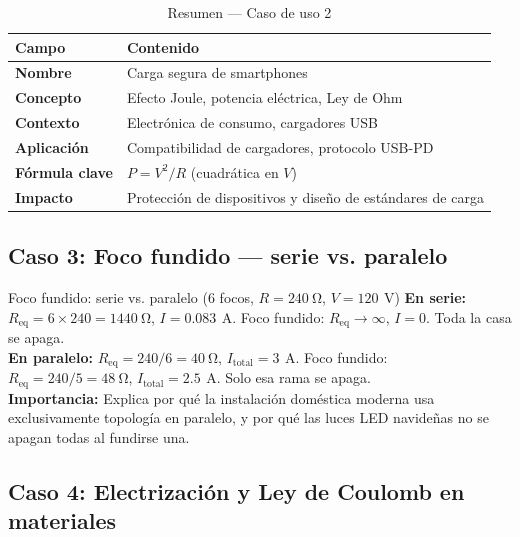 \documentclass[12pt, a4paper]{article}
\newcommand{\V}{\,\si{\volt}}
\newcommand{\A}{\,\si{\ampere}}
\newcommand{\Req}{R_{\mathrm{eq}}}
\begin{document}
\vspace{4pt}
\begin{table}[H]
\centering\small
\caption{Resumen --- Caso de uso 2}
\begin{tabularx}{0.85\linewidth}{>{\bfseries}lX}
\toprule
Campo & Contenido \\ \midrule
Nombre       & Carga segura de smartphones \\
Concepto     & Efecto Joule, potencia eléctrica, Ley de Ohm \\
Contexto     & Electrónica de consumo, cargadores USB \\
Aplicación   & Compatibilidad de cargadores, protocolo USB-PD \\
Fórmula clave & $P = V^2/R$ \;\;(cuadrática en $V$) \\
Impacto      & Protección de dispositivos y diseño de estándares de carga \\ \bottomrule
\end{tabularx}
\end{table}

\subsection{Caso 3: Foco fundido --- serie vs. paralelo}

\begin{casodeuso}{Foco fundido: serie vs. paralelo (6 focos, $R = \SI{240}{\ohm}$, $V = \SI{120}{\V}$)}
\textbf{En serie:}
$\Req = 6 \times 240 = \SI{1440}{\ohm}$,\; $I = \SI{0.083}{\A}$.
Foco fundido: $\Req \to \infty$,\; $I = 0$. Toda la casa se apaga.\\[4pt]
\textbf{En paralelo:}
$\Req = 240/6 = \SI{40}{\ohm}$,\; $I_{\mathrm{total}} = \SI{3}{\A}$.
Foco fundido: $\Req = 240/5 = \SI{48}{\ohm}$,\; $I_{\mathrm{total}} = \SI{2.5}{\A}$.
Solo esa rama se apaga.\\[4pt]
\textbf{Importancia:} Explica por qué la instalación doméstica moderna usa
exclusivamente topología en paralelo, y por qué las luces LED navideñas no
se apagan todas al fundirse una.
\end{casodeuso}

\subsection{Caso 4: Electrización y Ley de Coulomb en materiales}
\end{document}
